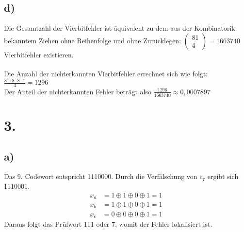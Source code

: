 \documentclass[a4paper]{scrartcl}
\begin{document}
	
	\subsection{d)}
		Die Gesamtzahl der Vierbitfehler ist äquivalent zu dem aus der Kombinatorik bekanntem Ziehen 
		ohne Reihenfolge und ohne Zurücklegen:
			\(\begin{pmatrix}
				81\\4
			\end{pmatrix}=
			1663740\) Vierbitfehler existieren. \\ \\
		Die Anzahl der nichterkannten Vierbitfehler errechnet sich wie folgt: 
		\(\frac{81\cdot 8\cdot 8\cdot 1}{4}=1296\) \\
		Der Anteil der nichterkannten Fehler beträgt also \(\frac{1296}{1663740}\approx 0,0007897\)

	
\section{3.}
	\subsection{a)}
		Das 9. Codewort entspricht 1110000. Durch die Verfälschung von \(c_7\) ergibt sich 1110001.\\
		\begin{align}
			x_a &= 1\oplus 1\oplus 0\oplus 1 = 1 \\
			x_b &= 1\oplus 1\oplus 0\oplus 1 = 1\\
			x_c &= 0\oplus 0\oplus 0\oplus 1 = 1
		\end{align}
		Daraus folgt das Prüfwort 111 oder 7, womit der Fehler lokalisiert ist.
		
	
\end{document}
